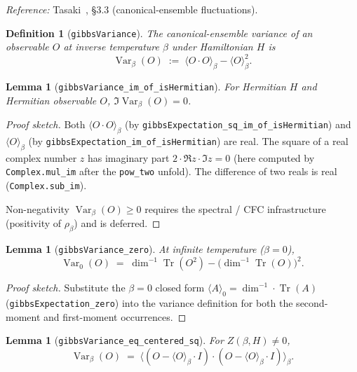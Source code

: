 \documentclass[a4paper,11pt]{article}
\newtheorem{lemma}[theorem]{Lemma}
\newtheorem{definition}[theorem]{Definition}
\begin{document}
\emph{Reference:} Tasaki~\cite{Tasaki:QMB}, §3.3 (canonical-ensemble
fluctuations).

\begin{definition}[\texttt{gibbsVariance}]
The canonical-ensemble \emph{variance} of an observable $O$ at
inverse temperature $\beta$ under Hamiltonian $H$ is
\[
  \operatorname{Var}_\beta(O)
  \;:=\;
  \langle O \cdot O \rangle_\beta - \langle O \rangle_\beta^2.
\]
\end{definition}

\begin{lemma}[\texttt{gibbsVariance\_im\_of\_isHermitian}]
For Hermitian $H$ and Hermitian observable $O$,
$\Im\operatorname{Var}_\beta(O) = 0$.
\end{lemma}

\begin{proof}[Proof sketch]
Both $\langle O \cdot O \rangle_\beta$ (by
\texttt{gibbsExpectation\_sq\_im\_of\_isHermitian}) and
$\langle O \rangle_\beta$ (by
\texttt{gibbsExpectation\_im\_of\_isHermitian}) are real. The square
of a real complex number $z$ has imaginary part $2 \cdot \Re z \cdot \Im z = 0$
(here computed by \texttt{Complex.mul\_im} after the \texttt{pow\_two}
unfold). The difference of two reals is real
(\texttt{Complex.sub\_im}).

Non-negativity $\operatorname{Var}_\beta(O) \geq 0$ requires the
spectral / CFC infrastructure (positivity of $\rho_\beta$) and is
deferred.
\end{proof}

\begin{lemma}[\texttt{gibbsVariance\_zero}]
At infinite temperature ($\beta = 0$),
\[
  \operatorname{Var}_0(O)
  \;=\;
  \dim^{-1} \operatorname{Tr}(O^2)
  - \bigl(\dim^{-1} \operatorname{Tr}(O)\bigr)^2.
\]
\end{lemma}

\begin{proof}[Proof sketch]
Substitute the $\beta = 0$ closed form
$\langle A \rangle_0 = \dim^{-1} \cdot \operatorname{Tr}(A)$
(\texttt{gibbsExpectation\_zero}) into the variance definition for both
the second-moment and first-moment occurrences.
\end{proof}

\begin{lemma}[\texttt{gibbsVariance\_eq\_centered\_sq}]
For $Z(\beta, H) \neq 0$,
\[
  \operatorname{Var}_\beta(O)
  \;=\;
  \langle (O - \langle O \rangle_\beta \cdot I) \cdot (O - \langle O \rangle_\beta \cdot I) \rangle_\beta.
\]
\end{lemma}
\end{document}
